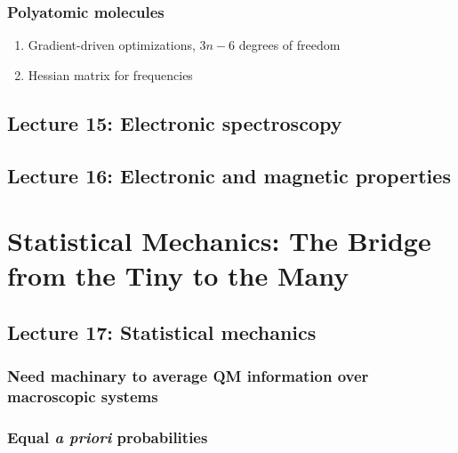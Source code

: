 \documentclass[11pt]{article}
\begin{document}
\subsubsection{Polyatomic molecules}
\label{sec:orgdc38e19}
\begin{enumerate}
\item Gradient-driven optimizations, \(3n-6\) degrees of freedom
\item Hessian matrix for frequencies
\end{enumerate}

\subsection{Lecture 15: Electronic spectroscopy}
\label{sec:org91eb613}
\subsection{Lecture 16: Electronic and magnetic properties}
\label{sec:org7be91be}

\section{Statistical Mechanics: The Bridge from the Tiny to the Many}
\label{sec:orge53df98}

\subsection{Lecture 17: Statistical mechanics}
\label{sec:org534fde8}
\subsubsection{Need machinary to average QM information over macroscopic systems}
\label{sec:orgf56931b}
\subsubsection{Equal \emph{a priori} probabilities}
\label{sec:org1f5172e}
\end{document}
